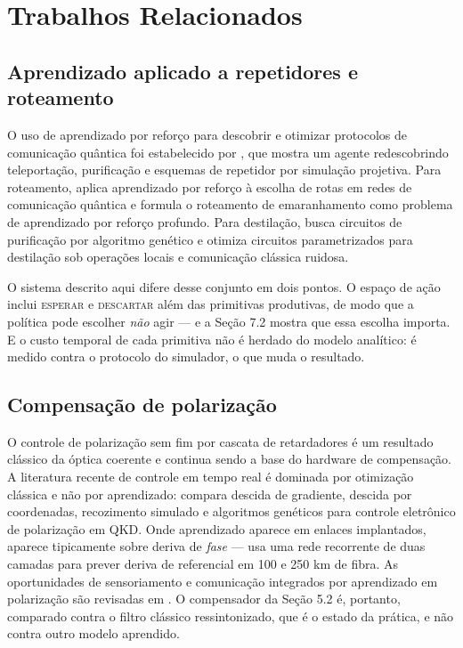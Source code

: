 \documentclass[12pt]{article}
\begin{document}
\section{Trabalhos Relacionados}

\subsection{Aprendizado aplicado a repetidores e roteamento}

O uso de aprendizado por reforço para descobrir e otimizar protocolos de
comunicação quântica foi estabelecido por \cite{wallnofer2020}, que mostra um
agente redescobrindo teleportação, purificação e esquemas de repetidor por
simulação projetiva. Para roteamento, \cite{roik2024} aplica aprendizado por
reforço à escolha de rotas em redes de comunicação quântica e \cite{le2022}
formula o roteamento de emaranhamento como problema de aprendizado por reforço
profundo. Para destilação, \cite{krastanov2019} busca circuitos de purificação
por algoritmo genético e \cite{chittoor2023} otimiza circuitos parametrizados
para destilação sob operações locais e comunicação clássica ruidosa.

O sistema descrito aqui difere desse conjunto em dois pontos. O espaço de ação
inclui \textsc{esperar} e \textsc{descartar} além das primitivas produtivas, de
modo que a política pode escolher \emph{não} agir --- e a Seção 7.2 mostra que
essa escolha importa. E o custo temporal de cada primitiva não é herdado do
modelo analítico: é medido contra o protocolo do simulador, o que muda o
resultado.

\subsection{Compensação de polarização}

O controle de polarização sem fim por cascata de retardadores é um resultado
clássico da óptica coerente \cite{noe1988} e continua sendo a base do hardware
de compensação. A literatura recente de controle em tempo real é dominada por
otimização clássica e não por aprendizado: \cite{young2026} compara descida de
gradiente, descida por coordenadas, recozimento simulado e algoritmos genéticos
para controle eletrônico de polarização em QKD. Onde aprendizado aparece em
enlaces implantados, aparece tipicamente sobre deriva de \emph{fase} ---
\cite{zhang2021} usa uma rede recorrente de duas camadas para prever deriva de
referencial em 100 e 250 km de fibra. As oportunidades de sensoriamento e
comunicação integrados por aprendizado em polarização são revisadas em
\cite{rode2025}. O compensador da Seção 5.2 é, portanto, comparado contra o
filtro clássico ressintonizado, que é o estado da prática, e não contra outro
modelo aprendido.
\end{document}
